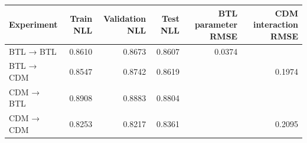 \begin{tabular}{lrrrrr}
\toprule
Experiment & Train NLL & Validation NLL & Test NLL & BTL parameter RMSE & CDM interaction RMSE \\
\midrule
BTL → BTL & 0.8610 & 0.8673 & 0.8607 & 0.0374 &  \\
BTL → CDM & 0.8547 & 0.8742 & 0.8619 &  & 0.1974 \\
CDM → BTL & 0.8908 & 0.8883 & 0.8804 &  &  \\
CDM → CDM & 0.8253 & 0.8217 & 0.8361 &  & 0.2095 \\
\bottomrule
\end{tabular}
